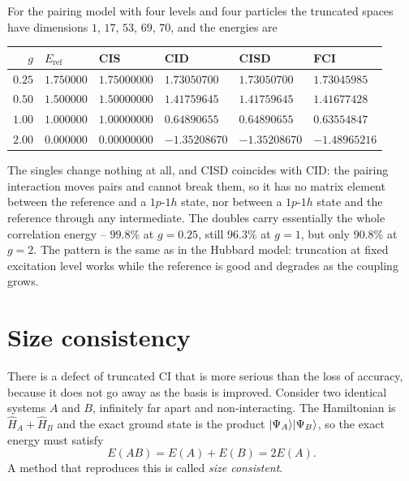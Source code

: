 For the pairing model with four levels and four particles the truncated
spaces have dimensions $1$, $17$, $53$, $69$, $70$, and the energies are
\begin{center}
\renewcommand{\arraystretch}{1.2}
\begin{tabular}{rlllll}
\toprule
$g$ & $E_{\mathrm{ref}}$ & CIS & CID & CISD & FCI\\
\midrule
$0.25$ & $1.750000$ & $1.75000000$ & $1.73050700$ & $1.73050700$ & $1.73045985$\\
$0.50$ & $1.500000$ & $1.50000000$ & $1.41759645$ & $1.41759645$ & $1.41677428$\\
$1.00$ & $1.000000$ & $1.00000000$ & $0.64890655$ & $0.64890655$ & $0.63554847$\\
$2.00$ & $0.000000$ & $0.00000000$ & $-1.35208670$ & $-1.35208670$ & $-1.48965216$\\
\bottomrule
\end{tabular}
\end{center}
The singles change nothing at all, and CISD coincides with CID: the pairing
interaction moves pairs and cannot break them, so it has no matrix element
between the reference and a $1p$-$1h$ state, nor between a $1p$-$1h$ state and
the reference through any intermediate.  The doubles carry essentially the
whole correlation energy -- $99.8\%$ at $g=0.25$, still $96.3\%$ at $g=1$,
but only $90.8\%$ at $g=2$.  The pattern is the same as in the Hubbard model:
truncation at fixed excitation level works while the reference is good and
degrades as the coupling grows.

\section{Size consistency}
\label{sec:sizeconsistency}

There is a defect of truncated CI that is more serious than the loss of
accuracy, because it does not go away as the basis is improved.  Consider two
identical systems $A$ and $B$, infinitely far apart and non-interacting.  The
Hamiltonian is $\hat{H}_A+\hat{H}_B$ and the exact ground state is the product
$\vert \Psi_A \rangle\vert \Psi_B \rangle$, so the exact energy must satisfy
\begin{equation}
  E(AB) = E(A) + E(B) = 2E(A).
  \label{eq:5-sizeconsistent}
\end{equation}
A method that reproduces this is called \emph{size consistent}.

